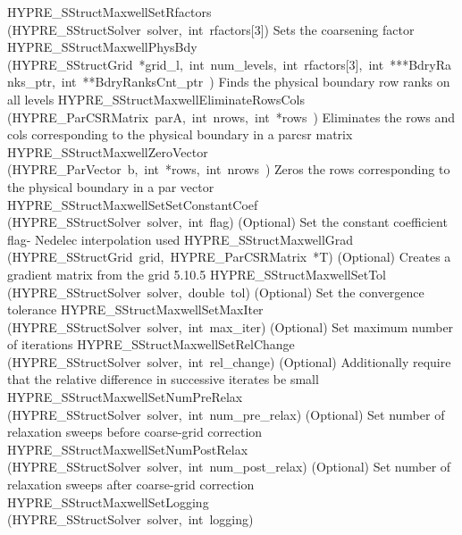 \documentclass{article}
\begin{document}
\begin{cxxentry}
\begin{cxxentry}
\begin{cxxnames}
        {HYPRE\_SStructMaxwellSetRfactors}
        {(HYPRE\_SStructSolver\ solver,\ int\ rfactors[3])}
        {
Sets the coarsening factor}
        {}
\label{cxx.5.10.8}
        {HYPRE\_SStructMaxwellPhysBdy}
        {(HYPRE\_SStructGrid\ *grid\_l,\ int\ num\_levels,\ int\ rfactors[3],\ int\ ***BdryRanks\_ptr,\ int\ **BdryRanksCnt\_ptr\ )}
        {
Finds the physical boundary row ranks on all levels}
        {}
\label{cxx.5.10.9}
        {HYPRE\_SStructMaxwellEliminateRowsCols}
        {(HYPRE\_ParCSRMatrix\ parA,\ int\ nrows,\ int\ *rows\ )}
        {
Eliminates the rows and cols corresponding to the physical boundary in
a parcsr matrix}
        {}
\label{cxx.5.10.10}
        {HYPRE\_SStructMaxwellZeroVector}
        {(HYPRE\_ParVector\ b,\ int\ *rows,\ int\ nrows\ )}
        {
Zeros the rows corresponding to the physical boundary in
a par vector}
        {}
\label{cxx.5.10.11}
        {HYPRE\_SStructMaxwellSetSetConstantCoef}
        {(HYPRE\_SStructSolver\ solver,\ int\ flag)}
        {
(Optional) Set the constant coefficient flag- Nedelec interpolation
used}
        {}
\label{cxx.5.10.12}
        {HYPRE\_SStructMaxwellGrad}
        {(HYPRE\_SStructGrid\ grid,\ HYPRE\_ParCSRMatrix\ *T)}
        {
(Optional) Creates a gradient matrix from the grid}
        {5.10.5}
        {HYPRE\_SStructMaxwellSetTol}
        {(HYPRE\_SStructSolver\ solver,\ double\ tol)}
        {
(Optional) Set the convergence tolerance}
        {}
\label{cxx.5.10.13}
        {HYPRE\_SStructMaxwellSetMaxIter}
        {(HYPRE\_SStructSolver\ solver,\ int\ max\_iter)}
        {
(Optional) Set maximum number of iterations}
        {}
\label{cxx.5.10.14}
        {HYPRE\_SStructMaxwellSetRelChange}
        {(HYPRE\_SStructSolver\ solver,\ int\ rel\_change)}
        {
(Optional) Additionally require that the relative difference in
successive iterates be small}
        {}
\label{cxx.5.10.15}
        {HYPRE\_SStructMaxwellSetNumPreRelax}
        {(HYPRE\_SStructSolver\ solver,\ int\ num\_pre\_relax)}
        {
(Optional) Set number of relaxation sweeps before coarse-grid correction}
        {}
\label{cxx.5.10.16}
        {HYPRE\_SStructMaxwellSetNumPostRelax}
        {(HYPRE\_SStructSolver\ solver,\ int\ num\_post\_relax)}
        {
(Optional) Set number of relaxation sweeps after coarse-grid correction}
        {}
\label{cxx.5.10.17}
        {HYPRE\_SStructMaxwellSetLogging}
        {(HYPRE\_SStructSolver\ solver,\ int\ logging)}

\end{cxxnames}
\end{cxxentry}
\end{cxxentry}
\end{document}
